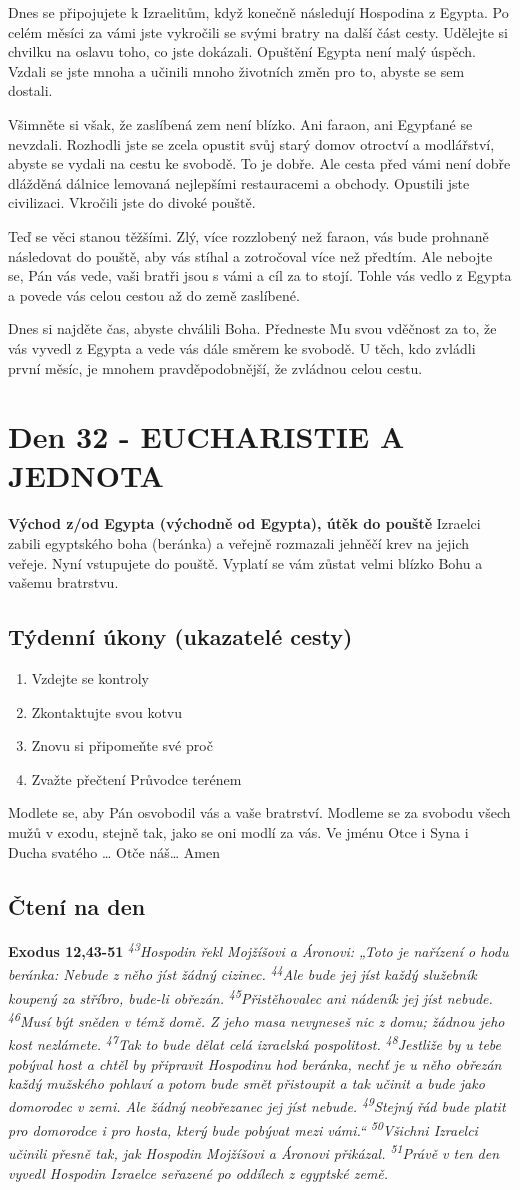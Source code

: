 \documentclass[11pt]{article}
\newcommand{\zacatekPatyTyden}{
  \textbf{Východ z/od Egypta (východně od Egypta), útěk do pouště} \newline
  Izraelci zabili egyptského boha (beránka) a veřejně rozmazali jehněčí krev na jejich veřeje. Nyní vstupujete
  do pouště. Vyplatí se vám zůstat velmi blízko Bohu a vašemu bratrstvu.

\subsection*{Týdenní úkony (ukazatelé cesty)}
\begin{enumerate}
  \item Vzdejte se kontroly
  \item Zkontaktujte svou kotvu
  \item Znovu si připomeňte své proč
  \item Zvažte přečtení Průvodce terénem
\end{enumerate}
Modlete se, aby Pán osvobodil vás a vaše bratrství. \newline
Modleme se za svobodu všech mužů v exodu, stejně tak, jako se oni modlí za vás.\newline
Ve jménu Otce i Syna i Ducha svatého …  Otče náš… Amen
}
\begin{document}
Dnes se připojujete k Izraelitům, když konečně následují Hospodina z Egypta. Po celém měsíci za vámi jste vykročili
se svými bratry na další část cesty. Udělejte si chvilku na oslavu toho, co jste dokázali. Opuštění Egypta není malý
úspěch. Vzdali se jste mnoha a učinili mnoho životních změn pro to, abyste se sem dostali.

Všimněte si však, že zaslíbená zem není blízko. Ani faraon, ani Egypťané se nevzdali. Rozhodli jste se zcela opustit
svůj starý domov otroctví a modlářství, abyste se vydali na cestu ke svobodě. To je dobře. Ale cesta před vámi není
dobře dlážděná dálnice lemovaná nejlepšími restauracemi a obchody. Opustili jste civilizaci. Vkročili jste do divoké
pouště.

Teď se věci stanou těžšími. Zlý, více rozzlobený než faraon, vás bude prohnaně následovat do pouště, aby vás stíhal a
zotročoval více než předtím. Ale nebojte se, Pán vás vede, vaši bratři jsou s vámi a cíl za to stojí. Tohle vás vedlo
z Egypta a povede vás celou cestou až do země zaslíbené.

Dnes si najděte čas, abyste chválili Boha. Předneste Mu svou vděčnost za to, že vás vyvedl z Egypta a vede vás dále
směrem ke svobodě. U těch, kdo zvládli první měsíc, je mnohem pravděpodobnější, že zvládnou celou cestu.

\newpage
\section{Den 32 - EUCHARISTIE A JEDNOTA}
\zacatekPatyTyden
\subsection*{Čtení na den}
\textbf{Exodus 12,43-51}
\newline
\textit{
\textsuperscript{43}Hospodin řekl Mojžíšovi a Áronovi: „Toto je nařízení o hodu beránka: Nebude z něho jíst žádný cizinec.
\textsuperscript{44}Ale bude jej jíst každý služebník koupený za stříbro, bude-li obřezán.
\textsuperscript{45}Přistěhovalec ani nádeník jej jíst nebude.
\textsuperscript{46}Musí být sněden v témž domě. Z jeho masa nevyneseš nic z domu; žádnou jeho kost nezlámete.
\textsuperscript{47}Tak to bude dělat celá izraelská pospolitost.
\textsuperscript{48}Jestliže by u tebe pobýval host a chtěl by připravit Hospodinu hod beránka, nechť je u něho obřezán každý mužského pohlaví a potom bude smět přistoupit a tak učinit a bude jako domorodec v zemi. Ale žádný neobřezanec jej jíst nebude.
\textsuperscript{49}Stejný řád bude platit pro domorodce i pro hosta, který bude pobývat mezi vámi.“
\textsuperscript{50}Všichni Izraelci učinili přesně tak, jak Hospodin Mojžíšovi a Áronovi přikázal.
\textsuperscript{51}Právě v ten den vyvedl Hospodin Izraelce seřazené po oddílech z egyptské země.
}
\end{document}

